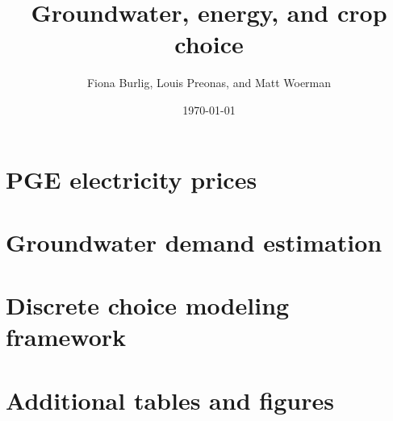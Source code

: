 \documentclass[hidelinks,12pt]{article}
\title{\vspace{-10mm} {Groundwater, energy, and crop choice}}
\date{\today}
\author{Fiona Burlig, Louis Preonas, and Matt Woerman}
\begin{document}
\setlength{\parindent}{0.9cm}
\begin{appendices}
\begin{refsection}
\begin{spacing}{1.1} {
\setcounter{page}{1}
\renewcommand\thepage{\arabic{page}}
\setcounter{figure}{0}
\renewcommand\thefigure{\Alph{section}\arabic{figure}}
\setcounter{table}{0}
\renewcommand\thetable{\Alph{section}\arabic{table}}
\setcounter{equation}{2}
\appendixpage

\section{PGE electricity prices}{\label{app:pge_prices}}


\section{Groundwater demand estimation}{\label{app:gw_demand}}


\section{Discrete choice modeling framework}{\label{app:discrete_choice}}


\newpage
\section{Additional tables and figures}{\label{app:tab_fig}}


}
\end{spacing}
\end{refsection}
\end{appendices}
\end{document}
